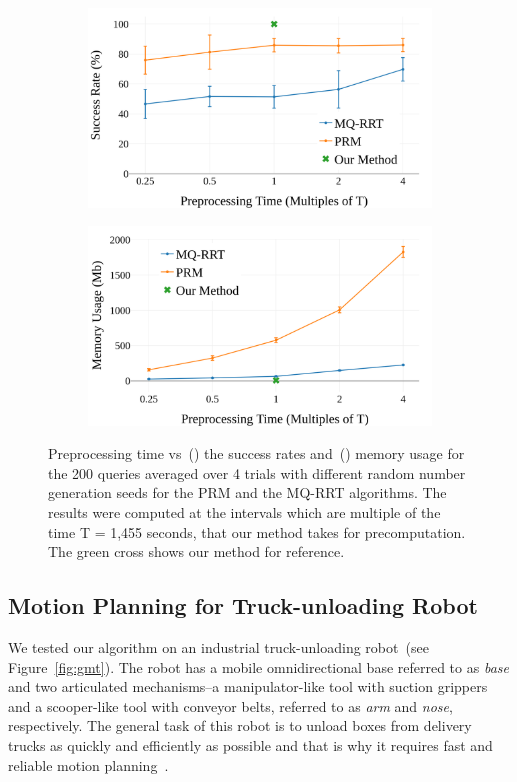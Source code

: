 \documentclass[a4paper]{report}
\begin{document}
\begin{figure}
\begin{subfigure}{0.48\textwidth}
\centering
   \includegraphics[width=0.9\linewidth]{success.png}
  \caption{}
  \label{fig:success}
\end{subfigure}
\hfill
\begin{subfigure}{0.48\textwidth}
\centering
   \includegraphics[width=0.9\linewidth]{memory.png}
  \caption{}
  \label{fig:memory}
\end{subfigure}
    \caption{Preprocessing time vs~() the success rates and~() memory usage for the 200 queries averaged over 4 trials with different random number generation seeds for the PRM and the MQ-RRT algorithms. The results were computed at the intervals which are multiple of the time T = 1,455 seconds, that our method takes for precomputation. The green cross shows our method for reference.}
    \label{fig:plots}
\end{figure}

\subsection{Motion Planning for Truck-unloading Robot}
We tested our algorithm on an industrial truck-unloading robot~(see Figure~\ref{fig:gmt}). The robot has a mobile omnidirectional base referred to as \textit{base} and two articulated mechanisms--a manipulator-like tool with suction grippers and a scooper-like tool with conveyor belts, referred to as \textit{arm} and \textit{nose}, respectively. The general task of this robot is to unload boxes from delivery trucks as quickly and efficiently as possible and that is why it requires fast and reliable motion planning~\cite{islam2019planning}.
\end{document}
